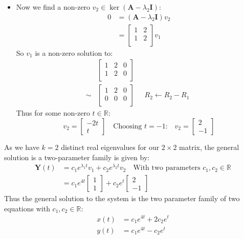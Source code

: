\documentclass[a4paper, 11pt]{article}
\newcommand{\RR}{\mathbb{R}}
\begin{document}
\begin{enumerate}[label=(\alph*)]
\begin{itemize}
    \item Now we find a non-zero $v_2\in\ker(\mathbf{A}-\lambda_2 \mathbf{I})$: 
    \begin{align*}
      0 &= (\mathbf{A}-\lambda_2 \mathbf{I})v_2\\
      &=\begin{bmatrix}
             1 & 2 \\ 
             1 & 2 \\ 
          \end{bmatrix}v_1
    \end{align*}
    So $v_1$ is a non-zero solution to: 
    \begin{align*}
      &\left[ 
        \begin{array}{cc|c}
         1 & 2 & 0 \\
         1 & 2 & 0 \\
        \end{array}
       \right]\\
       \sim&\left[ 
        \begin{array}{rr|r}
          1 & 2 & 0 \\
          0 & 0 & 0 \\
        \end{array}
       \right]\quad\begin{array}{l}
        R_2\leftarrow R_2-R_1
       \end{array}
    \end{align*}
    Thus for some non-zero $t\in\RR$:
    \[
     v_2=\begin{bmatrix}
      -2t \\
       t 
     \end{bmatrix}  \quad\text{Choosing $t=-1$:}\quad v_2=\begin{bmatrix}
      2\\
      -1
     \end{bmatrix}
    \]
  \end{itemize}
  As we have $k=2$ distinct real eigenvalues for our $2\times2$ matrix, the general solution is a two-parameter family is given by: 
  \begin{align*}
    \mathbf{Y}(t) &=c_1e^{\lambda_1t}v_1+c_2e^{\lambda_2t}v_2\quad\text{With two parameters $c_1,c_2\in\RR$}\\
    &=c_1e^{4t}
      \begin{bmatrix}
        1\\
        1
      \end{bmatrix}
      +c_2e^t 
      \begin{bmatrix}
        2\\
        -1
      \end{bmatrix}
  \end{align*}
  Thus the general solution to the system is the two parameter family of two equations with $c_1,c_2\in\RR$: 
  \begin{align*}
    x(t) &= c_1e^{4t}+2c_2e^t\\
    y(t) &= c_1e^{4t}-c_2e^t
  \end{align*}
  

\end{enumerate}
\end{document}

